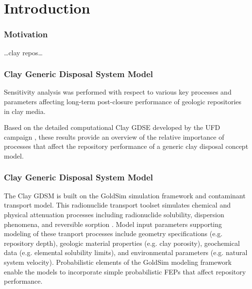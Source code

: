 
\section{Introduction}
\begin{frame}[c]
  \frametitle{Motivation}
  \ldots clay repos\ldots 
\end{frame}

\begin{frame}[c]
  \frametitle{Clay Generic Disposal System Model}
Sensitivity analysis was performed with respect to various key processes and 
parameters affecting long-term post-closure performance of geologic repositories 
in clay media. 

Based on the detailed computational Clay 
\gls{GDSE} developed by the \gls{UFD} campaign \cite{clayton_generic_2011}, 
these results provide an overview of the relative importance of processes 
that affect the repository performance of a generic clay disposal concept model. 
\end{frame}


\begin{frame}[c]
  \frametitle{Clay Generic Disposal System Model}
The Clay \gls{GDSM} is built on the GoldSim simulation framework and contaminant 
transport model.  This radionuclide transport toolset simulates chemical and 
physical attenuation processes including radionuclide solubility, dispersion 
phenomena, and reversible sorption \cite{golder_goldsim_2010, 
golder_goldsim_ct_2010}. Model input parameters supporting modeling of these 
tranport 
processes include geometry specifications (e.g. repository depth), geologic 
material properties (e.g. clay porosity), geochemical data 
(e.g. elemental solubility limits), and environmental parameters (e.g. natural 
system velocity). Probabilistic elements of the GoldSim modeling 
framework enable the models to incorporate simple probabilistic \gls{FEPs} that 
affect repository performance.
\end{frame}


